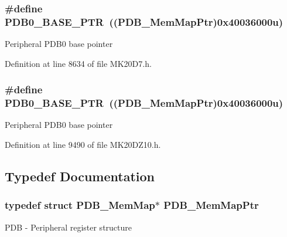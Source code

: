 \subsubsection[{\texorpdfstring{P\+D\+B0\+\_\+\+B\+A\+S\+E\+\_\+\+P\+TR}{PDB0_BASE_PTR}}]{\setlength{\rightskip}{0pt plus 5cm}\#define P\+D\+B0\+\_\+\+B\+A\+S\+E\+\_\+\+P\+TR~(({\bf P\+D\+B\+\_\+\+Mem\+Map\+Ptr})0x40036000u)}\hypertarget{group___p_d_b___peripheral_ga8e197b7c43fd7a0bf1a38caa1918b7b5}{}\label{group___p_d_b___peripheral_ga8e197b7c43fd7a0bf1a38caa1918b7b5}
Peripheral P\+D\+B0 base pointer 

Definition at line 8634 of file M\+K20\+D7.\+h.

\subsubsection[{\texorpdfstring{P\+D\+B0\+\_\+\+B\+A\+S\+E\+\_\+\+P\+TR}{PDB0_BASE_PTR}}]{\setlength{\rightskip}{0pt plus 5cm}\#define P\+D\+B0\+\_\+\+B\+A\+S\+E\+\_\+\+P\+TR~(({\bf P\+D\+B\+\_\+\+Mem\+Map\+Ptr})0x40036000u)}\hypertarget{group___p_d_b___peripheral_ga8e197b7c43fd7a0bf1a38caa1918b7b5}{}\label{group___p_d_b___peripheral_ga8e197b7c43fd7a0bf1a38caa1918b7b5}
Peripheral P\+D\+B0 base pointer 

Definition at line 9490 of file M\+K20\+D\+Z10.\+h.



\subsection{Typedef Documentation}
\subsubsection[{\texorpdfstring{P\+D\+B\+\_\+\+Mem\+Map\+Ptr}{PDB_MemMapPtr}}]{\setlength{\rightskip}{0pt plus 5cm}typedef struct {\bf P\+D\+B\+\_\+\+Mem\+Map}$\ast$ {\bf P\+D\+B\+\_\+\+Mem\+Map\+Ptr}}\hypertarget{group___p_d_b___peripheral_ga99a192ea14b33afb792a0de304e131be}{}\label{group___p_d_b___peripheral_ga99a192ea14b33afb792a0de304e131be}
P\+DB -\/ Peripheral register structure 
